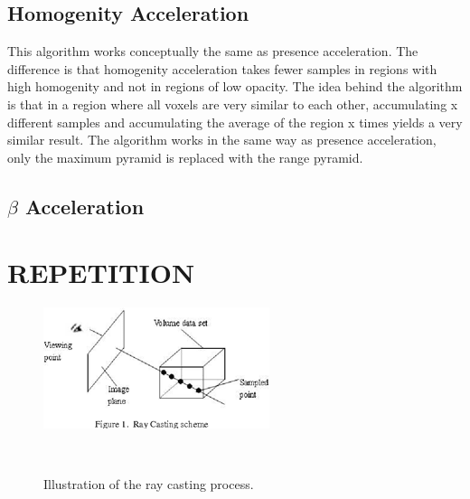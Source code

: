\subsection{Homogenity Acceleration}
This algorithm works conceptually the same as presence acceleration. The difference is that homogenity acceleration takes fewer samples in regions with high homogenity and not in regions of low opacity. The idea behind the algorithm is that in a region where all voxels are very similar to each other, accumulating x different samples and accumulating the average of the region x times yields a very similar result. The algorithm works in the same way as presence acceleration, only the maximum pyramid is replaced with the range pyramid.
\subsection{$\beta$  Acceleration}









\section{REPETITION}


\begin{figure}[htb]
  \centering
  \includegraphics[width=.8\linewidth]{RayCasting1.png}
  \parbox[t]{.9\columnwidth}{\relax}~\cite{Appa2015RayCF}
  \caption{\label{fig:img4}
          Illustration of the ray casting process.}
\end{figure}
